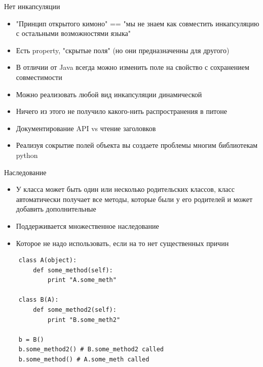 \documentclass{article}
\begin{document}
\begin{center} Нет инкапсуляции \end{center}
\begin{itemize}
    \item "Принцип открытого кимоно" == 
        "мы не знаем как совместить инкапсуляцию 
        с остальными возможностями языка"
    \item Есть property, "скрытые поля" (но они предназначенны для другого)
    \item В отличии от Java всегда можно изменить поле на свойство 
            с сохранением совместимости
    \item Можно реализовать любой вид инкапсуляции динамической
    \item Ничего из этого не получило какого-нить распространения в питоне
    \item Документирование API vs чтение заголовков
    \item Реализуя сокрытие полей объекта вы 
        создаете проблемы многим библиотекам python
\end{itemize}
\newpage

\begin{center} Наследование \end{center}
\begin{itemize}
    \item У класса может быть один или несколько родительских классов, 
          класс автоматически получает все методы, которые были у его родителей
          и может добавить дополнительные
    \item Поддерживается множественное наследование
    \item Которое не надо использовать, если на то нет существенных причин
\end{itemize}

{
\Large
\vspace{15pt}
\begin{lstlisting}
    class A(object):
        def some_method(self):
            print "A.some_meth"

    class B(A):
        def some_method2(self):
            print "B.some_meth2"

    b = B() 
    b.some_method2() # B.some_method2 called
    b.some_method() # A.some_meth called
\end{lstlisting}
}
\end{document}
